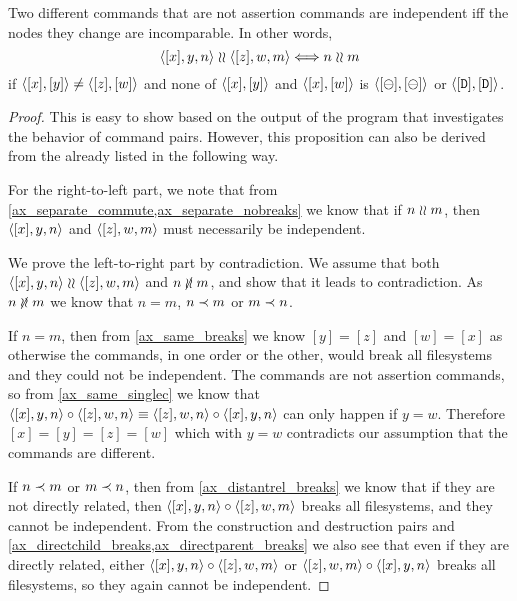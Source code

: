 \begin{mylem}\label{incomparable_is_independent}
Two different commands that are not assertion commands are independent iff the nodes they change are incomparable. In other words,
\[ \langle{[x],y,n}\rangle\mathrel{\wr\wr}\langle{[z],w,m}\rangle \Longleftrightarrow n\mathrel{\wr\wr} m \]
if $\langle{[x],[y]}\rangle\neq\langle{[z],[w]}\rangle$ and none of $\langle{[x],[y]}\rangle$ and $\langle{[x],[w]}\rangle$ is $\langle{[\ominus],[\ominus]}\rangle$ or $\langle{[\mathtt{D}],[\mathtt{D}]}\rangle$.
\end{mylem}
\begin{proof}
This is easy to show based on the output of the program that investigates the behavior of command pairs.
However, this proposition can also be derived from the  already listed
in the following way.

For the right-to-left part, we note that
from \cref{ax_separate_commute,ax_separate_nobreaks} we know that
if $n\mathrel{\wr\wr} m$, then $\langle{[x],y,n}\rangle$ and $\langle{[z],w,m}\rangle$ must necessarily be independent.

We prove the left-to-right part by contradiction.
We assume that both $\langle{[x],y,n}\rangle\mathrel{\wr\wr}\langle{[z],w,m}\rangle$ and $n\nunrel m$,
and show that it leads to contradiction.
As $n\nunrel m$
we know that $n=m$, $n\prec m$ or $m\prec n$.

If $n=m$, then from \cref{ax_same_breaks} we know $[y]=[z]$ and $[w]=[x]$
as otherwise the commands, in one order or the other, would break all filesystems
and they could not be independent.
The commands are not assertion commands, so from \cref{ax_same_singlec}
we know that $\langle{[x],y,n}\rangle\circ\langle{[z],w,n}\rangle\equiv\langle{[z],w,n}\rangle\circ\langle{[x],y,n}\rangle$ can only happen if $y=w$.
Therefore $[x]=[y]=[z]=[w]$ which with $y=w$ contradicts our assumption that the commands are different.

If $n\prec m$ or $m\prec n$, then
from \cref{ax_distantrel_breaks} we know that if they are not directly related,
then $\langle{[x],y,n}\rangle\circ\langle{[z],w,m}\rangle$ breaks all filesystems, and they cannot be independent.
From the construction and destruction pairs and 
\cref{ax_directchild_breaks,ax_directparent_breaks} we also see that
even if they are directly related, either
$\langle{[x],y,n}\rangle\circ\langle{[z],w,m}\rangle$ or $\langle{[z],w,m}\rangle\circ\langle{[x],y,n}\rangle$ 
breaks all filesystems, so they again cannot be independent.
\end{proof}

